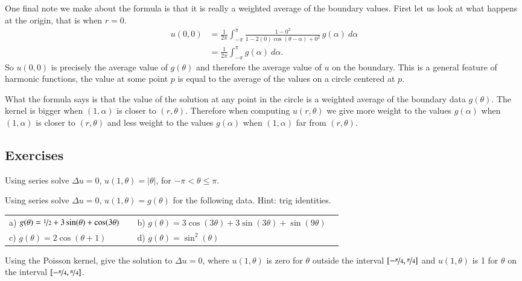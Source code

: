 \documentclass[12pt]{book}
\begin{document}
One final note we make about the formula is that it is really
a weighted average of the boundary values.
First let us look
at what happens at the origin,
that is when $r=0$. %
\begin{equation*}
\begin{split}
u(0,0) &= 
\frac{1}{2\pi} \int_{-\pi}^{\pi}
\frac{1 -0^2}{1 - 2(0)\cos(\theta-\alpha) +0^2} \, g(\alpha) ~ d\alpha
\\
& =
\frac{1}{2\pi} \int_{-\pi}^{\pi}
g(\alpha) ~ d\alpha .
\end{split}
\end{equation*}
So $u(0,0)$ is precisely the average value of $g(\theta)$ and
therefore the average value of $u$ on the boundary.  This is
a general feature of harmonic functions, the value at some point $p$
is equal to the average of the values on a circle centered at $p$.

What the formula says is that the value of the solution at any point in the
circle is a weighted average of the boundary data $g(\theta)$.  The kernel
is bigger when $(1,\alpha)$ is closer to $(r,\theta)$.  Therefore when
computing $u(r,\theta)$ we
give more weight to the values $g(\alpha)$ when $(1,\alpha)$ is closer to $(r,\theta)$ and less
weight to the values $g(\alpha)$ when $(1,\alpha)$ far from $(r,\theta)$.

\subsection{Exercises}

\begin{exercise}
Using series solve
$\Delta u = 0$, $u(1,\theta) = \lvert \theta \rvert$, for $-\pi < \theta
\leq \pi$.
\end{exercise}

\begin{exercise}
Using series solve $\Delta u = 0$, $u(1,\theta) = g(\theta)$ for the
following data.  Hint: trig identities.
\medskip

\noindent
\begin{tabular}{llll}
a)
$g(\theta) = 
\nicefrac{1}{2} + 3\sin(\theta) + \cos(3\theta)$
& &
b)
$g(\theta) = 
3\cos(3\theta) + 3\sin(3\theta) + \sin(9\theta)$
\\
c)
$g(\theta) = 2 \cos(\theta+1)$
& &
d)
$g(\theta) = \sin^2(\theta)$
\end{tabular}
\end{exercise}

\begin{exercise}
Using the Poisson kernel, give the solution to
$\Delta u = 0$, where $u(1,\theta)$ is zero for $\theta$ outside
the interval $[-\nicefrac{\pi}{4},\nicefrac{\pi}{4}]$ and 
$u(1,\theta)$ is 1 for $\theta$ on the interval
$[-\nicefrac{\pi}{4},\nicefrac{\pi}{4}]$.
\end{exercise}
\end{document}
